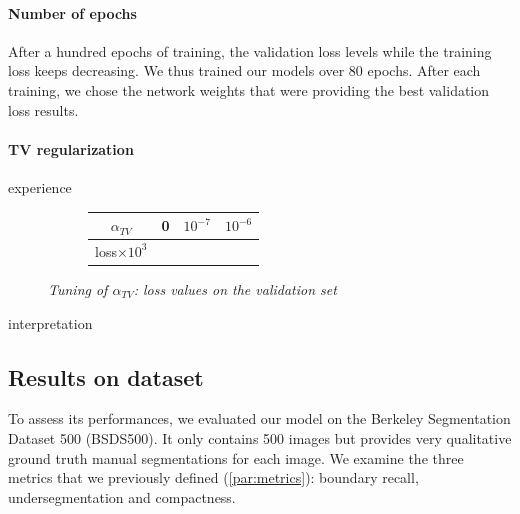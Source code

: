 \documentclass{article}
\begin{document}
        \paragraph{Number of epochs}
        After a hundred epochs of training, the validation loss levels while the training loss keeps decreasing. We thus trained our models over 80 epochs. After each training, we chose the network weights that were providing the best validation loss results.

        \paragraph{TV regularization}
            experience \cite{todo:tv-tuning}

            \begin{figure}[!ht]
                \begin{subfigure}{.49\linewidth}
                    \centering
                    \begin{tabular}{|c|c|c|c|}
                        \hline
                        $\alpha_{TV}$ & 0 & $10^{-7}$ & $10^{-6}$ \\
                        \hline \hline
                        loss$\times 10^3$ &   &   &  \\
                        \hline
                    \end{tabular}
                \end{subfigure}
                \begin{subfigure}{.49\linewidth}
                    \centering
                \end{subfigure}
                \caption{\textit{Tuning of $\alpha_{TV}$: loss values on the validation set}}
            \end{figure}
            \par
            interpretation \cite{toto:tv-interpretation}

    \subsection{Results on dataset}

        To assess its performances, we evaluated our model on the Berkeley Segmentation Dataset 500 (BSDS500)\cite{arbelaez2011}. It only contains 500 images but provides very qualitative ground truth manual segmentations for each image. We examine the three metrics that we previously defined (\ref{par:metrics}): boundary recall, undersegmentation and compactness.
\end{document}
